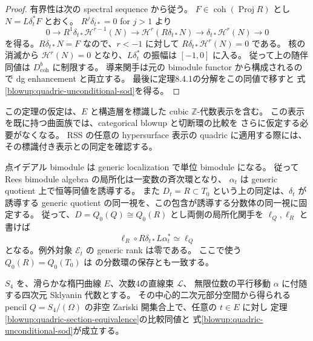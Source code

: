 \begin{proof}
有界性は次の spectral sequence から従う。
$F\in\operatorname{coh}(\operatorname{Proj}R)$ とし $N=L\delta_t^*F$ とおく。
$R^j\delta_{t*}=0$ for $j>1$ より
\[
 0\longrightarrow R^1\delta_{t*}\mathcal H^{r-1}(N)
 \longrightarrow\mathcal H^r(R\delta_{t*}N)
 \longrightarrow\delta_{t*}\mathcal H^r(N)\longrightarrow0
\]
を得る。$R\delta_{t*}N=F$ なので、$r<-1$ に対して
$R\delta_{t*}\mathcal H^r(N)=0$ である。
核の消滅から $\mathcal H^r(N)=0$ となり、$L\delta_t^*$ の振幅は $[-1,0]$ に入る。
従って上の随伴同値は $D^b_{\mathrm{coh}}$ に制限する。
導来関手は元の bimodule functor から構成されるので dg enhancement と両立する。
最後に定理8.4.1の分解をこの同値で移すと
式\eqref{blowup:quadric-unconditional-sod}を得る。
\end{proof}

\begin{remark}
この定理の仮定は、$E$ と構造層を標識した cubic $\mathbb Z$-代数表示を含む。
この表示を既に持つ曲面族では、categorical blowup と切断環の比較を
さらに仮定する必要がなくなる。
RSS の任意の hypersurface 表示の quadric に適用する際には、
その標識付き表示との同定を確認する。

点イデアル bimodule は generic localization で単位 bimodule になる。
従って Rees bimodule algebra の局所化は一変数の斉次環となり、
$\alpha_t$ は generic quotient 上で恒等同値を誘導する。
また $D_t=R\subset T_0$ という上の同定は、$\delta_t$ が誘導する
generic quotient の同一視を、この包含が誘導する分数体の同一視に固定する。
従って、$D=Q_0(Q)\cong Q_0(R)$ とし両側の局所化関手を $\ell_Q,\ell_R$ と書けば
\[
 \ell_R\circ R\delta_{t*}L\alpha_t^*\simeq\ell_Q
\]
となる。例外対象 $\mathcal E_t$ の generic rank は零である。
ここで使う $Q_0(R)=Q_0(T_0)$ は
\cite[定理1.1(2)]{BlowupRSS2015}の分数環の保存とも一致する。
\end{remark}

\begin{proposition}
\label{blowup:generic-sklyanin-quadric}
$S_4$ を、滑らかな楕円曲線 $E$、次数4の直線束 $\mathcal L$、
無限位数の平行移動 $\alpha$ に付随する四次元 Sklyanin 代数とする。
その中心的二次元部分空間から得られる pencil
$Q=S_4/(\Omega)$ の非空 Zariski 開集合上で、任意の $t\in E$ に対し
定理\ref{blowup:quadric-section-equivalence}の比較同値と
式\eqref{blowup:quadric-unconditional-sod}が成立する。
\end{proposition}

